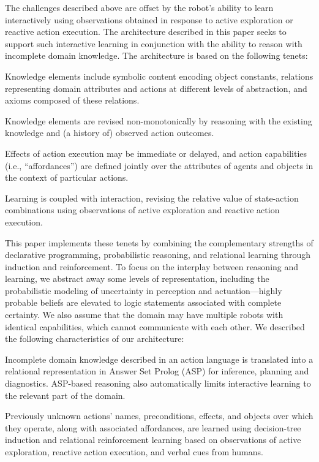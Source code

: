 \documentclass{article}
\newenvironment{s_itemize}{\begin{list}{$\bullet$}
{\setlength{\rightmargin}{0em}
\setlength{\itemsep}{0em}
\setlength{\topsep}{0em}
\setlength{\parsep}{0em}}}{\end{list}}
\begin{document}
The challenges described above are offset by the robot's ability to
learn interactively using observations obtained in response to active
exploration or reactive action execution. The architecture described
in this paper seeks to support such interactive learning in
conjunction with the ability to reason with incomplete domain
knowledge. The architecture is based on the following tenets:
\begin{s_itemize}
\item Knowledge elements include symbolic content encoding object
  constants, relations representing domain attributes and actions at
  different levels of abstraction, and axioms composed of these
  relations.

\item Knowledge elements are revised non-monotonically by reasoning
  with the existing knowledge and (a history of) observed action
  outcomes.

\item Effects of action execution may be immediate or delayed, and
  action capabilities (i.e., ``affordances'') are defined jointly over
  the attributes of agents and objects in the context of particular
  actions.

\item Learning is coupled with interaction, revising the relative
  value of state-action combinations using observations of active
  exploration and reactive action execution.
\end{s_itemize}
This paper implements these tenets by combining the complementary
strengths of declarative programming, probabilistic reasoning, and
relational learning through induction and reinforcement. To focus on
the interplay between reasoning and learning, we abstract away some
levels of representation, including the probabilistic modeling of
uncertainty in perception and actuation---highly probable beliefs are
elevated to logic statements associated with complete certainty. We
also assume that the domain may have multiple robots with identical
capabilities, which cannot communicate with each other. We described
the following characteristics of our architecture:
\begin{s_itemize}
\item Incomplete domain knowledge described in an action language is
  translated into a relational representation in Answer Set Prolog
  (ASP) for inference, planning and diagnostics. ASP-based reasoning
  also automatically limits interactive learning to the relevant part
  of the domain.

\item Previously unknown actions' names, preconditions, effects, and
  objects over which they operate, along with associated affordances,
  are learned using decision-tree induction and relational
  reinforcement learning based on observations of active exploration,
  reactive action execution, and verbal cues from humans.
\end{s_itemize}
\end{document}
